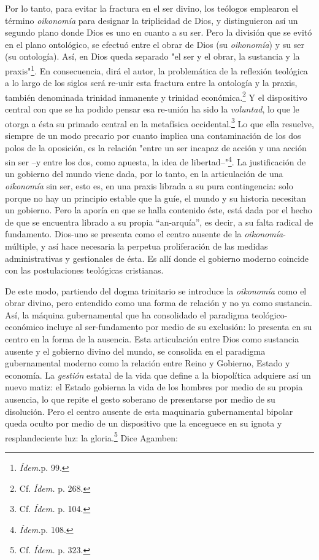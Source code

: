 Por lo tanto, para evitar la fractura en el ser divino, los teólogos
emplearon el término \emph{oikonomía} para designar la triplicidad de
Dios, y distinguieron así un segundo plano donde Dios es uno en cuanto a
su ser. Pero la división que se evitó en el plano ontológico, se efectuó
entre el obrar de Dios (su \emph{oikonomía}) y su ser (su ontología).
Así, en Dios queda separado "el ser y el obrar, la sustancia y la
praxis"\footnote{\emph{Ídem.}p. 99.}. En consecuencia, dirá el autor, la
problemática de la reflexión teológica a lo largo de los siglos será
re-unir esta fractura entre la ontología y la praxis, también denominada
trinidad inmanente y trinidad económica.\footnote{Cf. \emph{Ídem.} p.
  268.} Y el dispositivo central con que se ha podido pensar esa
re-unión ha sido la \emph{voluntad}, lo que le otorga a ésta su primado
central en la metafísica occidental.\footnote{Cf. \emph{Ídem.} p. 104.}
Lo que ella resuelve, siempre de un modo precario por cuanto implica una
contaminación de los dos polos de la oposición, es la relación "entre un
ser incapaz de acción y una acción sin ser --y entre los dos, como
apuesta, la idea de libertad--"\footnote{\emph{Ídem.}p. 108.}. La
justificación de un gobierno del mundo viene dada, por lo tanto, en la
articulación de una \emph{oikonomía} sin ser, esto es, en una praxis
librada a su pura contingencia: solo porque no hay un principio estable
que la guíe, el mundo y su historia necesitan un gobierno. Pero la
aporía en que se halla contenido éste, está dada por el hecho de que se
encuentra librado a su propia ``an-arquía'', es decir, a su falta
radical de fundamento. Dios-uno se presenta como el centro ausente de la
\emph{oikonomía}-múltiple, y así hace necesaria la perpetua
proliferación de las medidas administrativas y gestionales de ésta. Es
allí donde el gobierno moderno coincide con las postulaciones teológicas
cristianas.

De este modo, partiendo del dogma trinitario se introduce la
\emph{oikonomía} como el obrar divino, pero entendido como una forma de
relación y no ya como sustancia. Así, la máquina gubernamental que ha
consolidado el paradigma teológico-económico incluye al ser-fundamento
por medio de su exclusión: lo presenta en su centro en la forma de la
ausencia. Esta articulación entre Dios como sustancia ausente y el
gobierno divino del mundo, se consolida en el paradigma gubernamental
moderno como la relación entre Reino y Gobierno, Estado y economía. La
\emph{gestión} estatal de la vida que define a la biopolítica adquiere
así un nuevo matiz: el Estado gobierna la vida de los hombres por medio
de su propia ausencia, lo que repite el gesto soberano de presentarse
por medio de su disolución. Pero el centro ausente de esta maquinaria
gubernamental bipolar queda oculto por medio de un dispositivo que la
enceguece en su ignota y resplandeciente luz: la gloria.\footnote{Cf.
  \emph{Ídem.} p. 323.} Dice Agamben:

